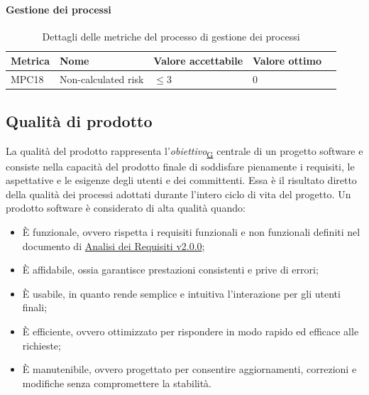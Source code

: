 \documentclass[a4paper,12pt]{article}
\begin{document}
{{{            \paragraph{Gestione dei processi}
            \leavevmode
                \begin{table}[H]
                \centering
                    \begin{tabular}{|l|l|l|l|l|}
                        \hline
                        \rowcolor{gold}
                        \textbf{Metrica} & \textbf{Nome} & \textbf{Valore accettabile} & \textbf{Valore ottimo} \\
                        \hline
                        MPC18 & Non-calculated risk & $\le 3$ & 0 \\
                        \hline
                    \end{tabular}
                    \caption{Dettagli delle metriche del processo di gestione dei processi} 
                    \label{tab:metriche-processi}
                \end{table}
        }
    }

    \subsection{Qualità di prodotto}{
        La qualità del prodotto rappresenta l'\textit{obiettivo}\textsubscript{\href{https://atlasteam9.github.io/Atlas/glossario.html\#Obiettivo}{G}} centrale di un progetto software e consiste nella capacità del prodotto finale di soddisfare pienamente i requisiti, le aspettative e le esigenze degli utenti e dei committenti. Essa è il risultato diretto della qualità dei processi adottati durante l'intero ciclo di vita del progetto. Un prodotto software è considerato di alta qualità quando:
        \begin{itemize}
            \item È funzionale, ovvero rispetta i requisiti funzionali e non funzionali definiti nel documento di \href{https://atlasteam9.github.io/Atlas/docs/PB/documenti/esterni/Analisi%20dei%20Requisiti.pdf}{Analisi dei Requisiti v2.0.0};
            \item È affidabile, ossia garantisce prestazioni consistenti e prive di errori;
            \item È usabile, in quanto rende semplice e intuitiva l'interazione per gli utenti finali;
            \item È efficiente, ovvero ottimizzato per rispondere in modo rapido ed efficace alle richieste;
            \item È manutenibile, ovvero progettato per consentire aggiornamenti, correzioni e modifiche senza compromettere la stabilità.
        \end{itemize}
    
}}
\end{document}
